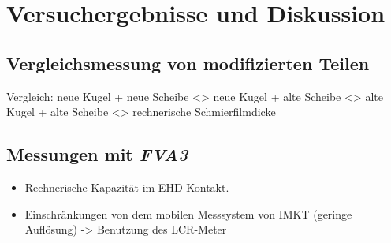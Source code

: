 \chapter{Versuchergebnisse und Diskussion}
\label{chap:ergebnisse_und_diskussion}

\section{Vergleichsmessung von modifizierten Teilen}
\label{sec:vergleichsmessung_von_difizierten_Teilen}

Vergleich: neue Kugel + neue Scheibe <> neue Kugel + alte Scheibe <> alte Kugel + alte Scheibe <> rechnerische Schmierfilmdicke

\section{Messungen mit \textit{FVA3}}
\label{sec:messungen_mit_fva3}

\begin{itemize}
    \item Rechnerische Kapazität im EHD-Kontakt.
    \item Einschränkungen von dem mobilen Messsystem von IMKT (geringe Auflösung) -> Benutzung des LCR-Meter
\end{itemize}

